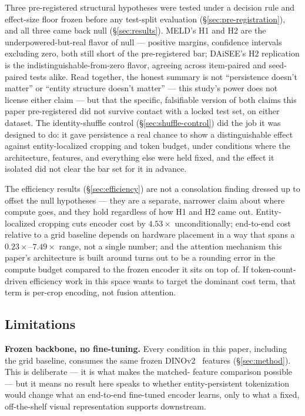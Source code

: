 \label{sec:discussion}

Three pre-registered structural hypotheses were tested under a decision
rule and effect-size floor frozen before any test-split evaluation
(\S\ref{sec:pre-registration}), and all three came back null
(\S\ref{sec:results}). MELD's H1 and H2 are the underpowered-but-real flavor
of null --- positive margins, confidence intervals excluding zero, both
still short of the pre-registered bar; DAiSEE's H2 replication is the
indistinguishable-from-zero flavor, agreeing across item-paired and
seed-paired tests alike. Read together, the honest summary is not
``persistence doesn't matter'' or ``entity structure doesn't matter'' ---
this study's power does not license either claim --- but that the specific,
falsifiable version of both claims this paper pre-registered did not survive
contact with a locked test set, on either dataset. The identity-shuffle
control (\S\ref{sec:shuffle-control}) did the job it was designed to do: it
gave persistence a real chance to show a distinguishable effect against
entity-localized cropping and token budget, under conditions where the
architecture, features, and everything else were held fixed, and the effect
it isolated did not clear the bar set for it in advance.

The efficiency results (\S\ref{sec:efficiency}) are not a consolation
finding dressed up to offset the null hypotheses --- they are a separate,
narrower claim about where compute goes, and they hold regardless of how H1
and H2 came out. Entity-localized cropping cuts encoder cost by $4.53\times$
unconditionally; end-to-end cost relative to a grid baseline depends on
hardware placement in a way that spans a $0.23\times$--$7.49\times$ range,
not a single number; and the attention mechanism this paper's architecture
is built around turns out to be a rounding error in the compute budget
compared to the frozen encoder it sits on top of. If token-count-driven
efficiency work in this space wants to target the dominant cost term, that
term is per-crop encoding, not fusion attention.

\subsection{Limitations}
\label{sec:limitations}

\textbf{Frozen backbone, no fine-tuning.} Every condition in this paper,
including the grid baseline, consumes the same frozen DINOv2~\cite{oquab2023dinov2} features
(\S\ref{sec:method}). This is deliberate --- it is what makes the matched-
feature comparison possible --- but it means no result here speaks to
whether entity-persistent tokenization would change what an end-to-end
fine-tuned encoder learns, only to what a fixed, off-the-shelf visual
representation supports downstream.


